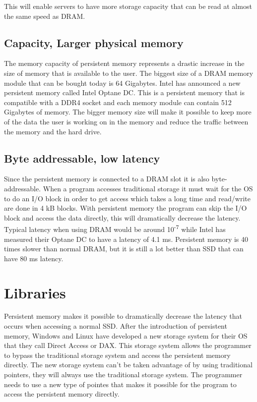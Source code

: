 \documentclass[12pt,a4paper,UKenglish]{article}
\begin{document}
This will enable servers to have more storage capacity that can be read at almost the same speed as DRAM.

\subsection{Capacity, Larger physical memory}
The memory capacity of persistent memory represents a drastic increase in the size of memory that is available to the user. The biggest size of a DRAM memory module that can be bought today is 64 Gigabytes. Intel has announced a new persistent memory called Intel Optane DC\cite{side1}. This is a persistent memory that is compatible with a DDR4 socket and each memory module can contain 512 Gigabytes of memory. The bigger memory size will make it possible to keep more of the data the user is working on in the memory and reduce the traffic between the memory and the hard drive.

\subsection{Byte addressable, low latency}
Since the persistent memory is connected to a DRAM slot it is also byte-addressable. When a program accesses traditional storage it must wait for the OS to do an I/O block in order to get access which takes a long time and read/write are done in 4 kB blocks. With persistent memory the program can skip the I/O block and access the data directly, this will dramatically decrease the latency. Typical latency when using DRAM would be around 10\textsuperscript{-7}\cite{lerebok} while Intel has measured their Optane DC to have a latency of 4.1 ms\cite{optane2}. Persistent memory is 40 times slower than normal DRAM, but it is still a lot better than SSD that can have 80 ms latency. 

\section{Libraries}
Persistent memory makes it possible to dramatically decrease the latency that occurs when accessing a normal SSD. After the introduction of persistent memory, Windows and Linux have developed a new storage system for their OS that they call Direct Access or DAX. This storage system allows the programmer to bypass the traditional storage system and access the persistent memory directly\cite{Rudoff}. The new storage system can’t be taken advantage of by using traditional pointers, they will always use the traditional storage system. The programmer needs to use a new type of pointes that makes it possible for the program to access the persistent memory directly.
\end{document}
